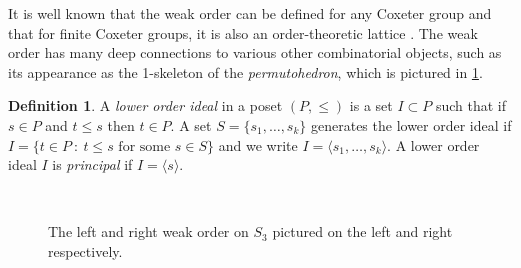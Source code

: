\documentclass[12pt, reqno]{amsart}
\numberwithin{equation}{section}
\theoremstyle{plain}
\theoremstyle{definition}
\newtheorem{definition}[theorem]{Definition}
\begin{document}
It is well known that the weak order can be defined for any Coxeter group and that for finite Coxeter groups, it is also an order-theoretic lattice \cite{bjornerbrenticoxeter}. The weak order has many deep connections to various other combinatorial objects, such as its appearance as the 1-skeleton of the \emph{permutohedron}, which is pictured in \cref{fig:weak-order}. 

\begin{definition}
A \emph{lower order ideal} in a poset $(P, \leq)$ is a set $I \subset P$ such that if $s \in P$ and $t \leq s$ then $t \in P$. A set $S = \{s_1, \ldots, s_k\}$ generates the lower order ideal if $I = \{t \in P ~:~ t \leq s \text{ for some } s \in S\}$ and we write $I = \langle s_1, \ldots, s_k \rangle$.  A lower order ideal $I$ is \emph{principal} if $I = \langle s \rangle$. 
\end{definition}

\begin{figure}
\centering
{}
~~~~~
\caption{The left and right weak order on $S_3$ pictured on the left and right respectively.}
\label{fig:weak-order}
\end{figure}
\end{document}
